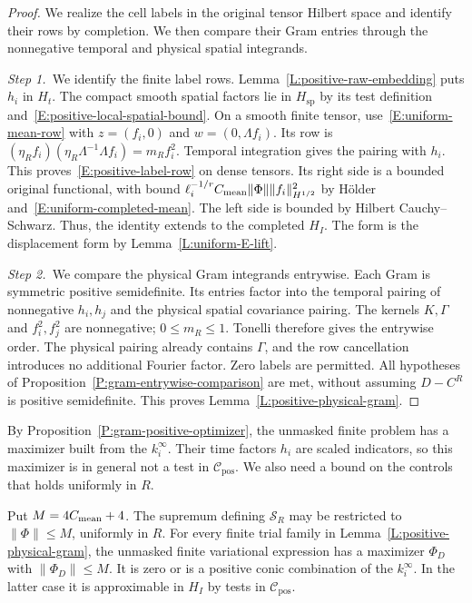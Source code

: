 \begin{proof}
  We realize the cell labels in the original tensor Hilbert space and identify
  their rows by completion. We then compare their Gram entries through the
  nonnegative temporal and physical spatial integrands.


  \medskip
  \noindent\textit{Step 1.~}We identify the finite label rows.
  Lemma~\ref{L:positive-raw-embedding} puts $h_i$ in $H_t$. The compact smooth
  spatial factors lie in $H_{\mathrm{sp}}$ by its test definition
  and~\eqref{E:positive-local-spatial-bound}. On a smooth finite tensor,
  use~\eqref{E:uniform-mean-row} with $z = (f_i,0)$ and $w = (0,\Lambda f_i)$.
  Its row is $(\eta_Rf_i)(\eta_R\Lambda^{-1}\Lambda f_i) = m_Rf_i^2$. Temporal
  integration gives the pairing with $h_i$. This
  proves~\eqref{E:positive-label-row} on dense tensors. Its right side is a
  bounded original functional, with bound $\ell_i^{-1/r}C_{\rm
  mean}\|\Phi\|\|f_i\|_{H^{1/2}}^2$ by Hölder
  and~\eqref{E:uniform-completed-mean}. The left side is bounded by Hilbert
  Cauchy--Schwarz. Thus, the identity extends to the completed $H_I$. The form
  is the displacement form by Lemma~\ref{L:uniform-E-lift}.


  \medskip
  \noindent\textit{Step 2.~}We compare the physical Gram integrands entrywise.
  Each Gram is symmetric positive semidefinite. Its entries factor into the
  temporal pairing of nonnegative $h_i,h_j$ and the physical spatial covariance
  pairing. The kernels $K,\Gamma$ and $f_i^2,f_j^2$ are nonnegative; $0 \le m_R
  \le 1$. Tonelli therefore gives the entrywise order. The physical pairing
  already contains $\Gamma$, and the row cancellation introduces no additional
  Fourier factor. Zero labels are permitted. All hypotheses of
  Proposition~\ref{P:gram-entrywise-comparison} are met, without assuming
  $D-C^R$ is positive semidefinite. This proves
  Lemma~\ref{L:positive-physical-gram}.
\end{proof}

By Proposition~\ref{P:gram-positive-optimizer}, the unmasked finite problem has
a maximizer built from the $k_i^\infty$. Their time factors $h_i$ are scaled
indicators, so this maximizer is in general not a test in
$\mathcal{C}_{\mathrm{pos}}$. We also need a bound on the controls that holds
uniformly in $R$.

\begin{lemma}
  \label{L:positive-uniform-optimizer}
  Put $M = 4C_{\rm mean}+4$. The supremum defining $\mathcal{S}_R$ may be
  restricted to $\|\Phi\| \le M$, uniformly in $R$. For every finite trial
  family in Lemma~\ref{L:positive-physical-gram}, the unmasked finite
  variational expression has a maximizer $\Phi_D$ with $\|\Phi_D\| \le M$. It is
  zero or is a positive conic combination of the $k_i^\infty$. In the latter
  case it is approximable in $H_I$ by tests in $\mathcal{C}_{\mathrm{pos}}$.
\end{lemma}

